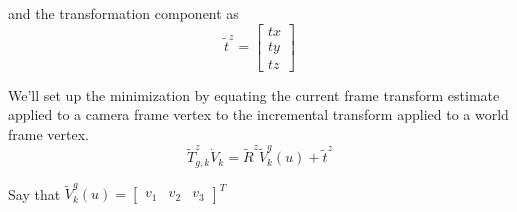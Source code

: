 \documentclass[12pt]{article}
\begin{document}
and the transformation component as
\begin{equation}
\tilde{t}^{z} = 
\begin{bmatrix}
tx \\ ty \\ tz
\end{bmatrix}
\end{equation}
  
We'll set up the minimization by equating the current frame transform estimate applied to a camera frame vertex to the incremental transform applied to a world frame vertex.
\begin{equation}
\tilde{T}_{g,k}^{z} \dot{V}_{k}= \tilde{R}^{z} \tilde{V}_{k}^{g}(u) + \tilde{t}^{z}
\end{equation}
  
Say that $\tilde{V}_{k}^{g}(u) = \begin{bmatrix} v_{1} & v_{2} & v_{3} \end{bmatrix}^{T}$
  
\end{document}
